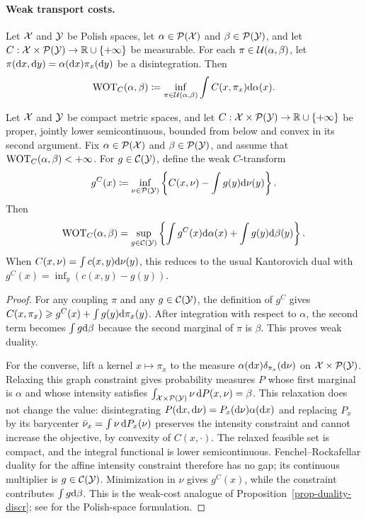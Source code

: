 \paragraph{Weak transport costs.}
\begin{defn}\label{def-weak-optimal-transport}
Let $\mathcal{X}$ and $\mathcal{Y}$ be Polish spaces, let $\alpha\in\mathcal{P}(\mathcal{X})$ and $\beta\in\mathcal{P}(\mathcal{Y})$, and let $C:\mathcal{X}\times\mathcal{P}(\mathcal{Y})\to\mathbb{R}\cup\{+\infty\}$ be measurable. For each $\pi\in\mathcal{U}(\alpha,\beta)$, let
$\pi(\mathrm{d} x,\mathrm{d} y)=\alpha(\mathrm{d} x)\pi_x(\mathrm{d} y)$ be a disintegration. Then
\begin{equation}\label{eq-weak-ot}
\operatorname{WOT}_C(\alpha,\beta)
\coloneqq
\inf_{\pi\in\mathcal{U}(\alpha,\beta)}
\int C(x,\pi_x)\mathrm{d}\alpha(x).
\end{equation}
\end{defn}
\begin{prop}\label{prop-weak-ot-duality}
Let $\mathcal{X}$ and $\mathcal{Y}$ be compact metric spaces, and let $C:\mathcal{X}\times\mathcal{P}(\mathcal{Y})\to\mathbb{R}\cup\{+\infty\}$ be proper, jointly lower semicontinuous, bounded from below and convex in its second argument. Fix $\alpha\in\mathcal{P}(\mathcal{X})$ and $\beta\in\mathcal{P}(\mathcal{Y})$, and assume that $\operatorname{WOT}_C(\alpha,\beta)<+\infty$. For $g\in\mathcal{C}(\mathcal{Y})$, define the weak $C$-transform
\[
g^C(x)
\coloneqq
\inf_{\nu\in\mathcal{P}(\mathcal{Y})}
\left\{
C(x,\nu)-\int g(y)\mathrm{d}\nu(y)
\right\}.
\]
Then
\[
\operatorname{WOT}_C(\alpha,\beta)
=
\sup_{g\in\mathcal{C}(\mathcal{Y})}
\left\{
\int g^C(x)\mathrm{d}\alpha(x)+\int g(y)\mathrm{d}\beta(y)
\right\}.
\]
When $C(x,\nu)=\int c(x,y)\mathrm{d}\nu(y)$, this reduces to the usual Kantorovich dual with $g^C(x)=\inf_y(c(x,y)-g(y))$.
\end{prop}
\begin{proof}
For any coupling $\pi$ and any $g\in\mathcal{C}(\mathcal{Y})$, the definition of $g^C$ gives
\(C(x,\pi_x)\geqslant g^C(x)+\int g(y)\mathrm{d}\pi_x(y)\).
After integration with respect to $\alpha$, the second term becomes $\int g\mathrm{d}\beta$ because the second marginal of $\pi$ is $\beta$. This proves weak duality.

For the converse, lift a kernel $x\mapsto\pi_x$ to the measure $\alpha(\mathrm{d} x)\delta_{\pi_x}(\mathrm{d}\nu)$ on $\mathcal{X}\times\mathcal{P}(\mathcal{Y})$. Relaxing this graph constraint gives probability measures $P$ whose first marginal is $\alpha$ and whose intensity satisfies
\(\int_{\mathcal{X}\times\mathcal{P}(\mathcal{Y})}\nu\,\mathrm{d} P(x,\nu)=\beta\).
This relaxation does not change the value: disintegrating $P(\mathrm{d} x,\mathrm{d}\nu)=P_x(\mathrm{d}\nu)\alpha(\mathrm{d} x)$ and replacing $P_x$ by its barycenter $\bar\nu_x=\int\nu\,\mathrm{d} P_x(\nu)$ preserves the intensity constraint and cannot increase the objective, by convexity of $C(x,\cdot)$. The relaxed feasible set is compact, and the integral functional is lower semicontinuous. Fenchel--Rockafellar duality for the affine intensity constraint therefore has no gap; its continuous multiplier is $g\in\mathcal{C}(\mathcal{Y})$. Minimization in $\nu$ gives $g^C(x)$, while the constraint contributes $\int g\mathrm{d}\beta$. This is the weak-cost analogue of Proposition~\ref{prop-duality-discr}; see for the Polish-space formulation.
\end{proof}
